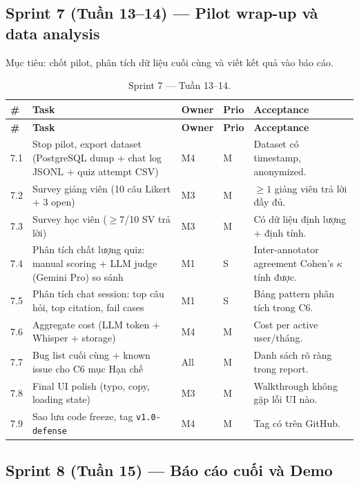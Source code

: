 \subsection{Sprint 7 (Tuần 13--14) --- Pilot wrap-up và data analysis}
\label{subsec:sprint7-gd2}

Mục tiêu: chốt pilot, phân tích dữ liệu cuối cùng và viết kết quả vào
báo cáo.

\begin{longtable}{|p{0.7cm}|p{6.3cm}|p{1.2cm}|p{1cm}|p{3cm}|}
    \caption{Sprint 7 --- Tuần 13--14.}
    \label{tab:sprint7-gd2} \\
    \hline
    \textbf{\#} & \textbf{Task} & \textbf{Owner} & \textbf{Prio} & \textbf{Acceptance} \\
    \hline
    \endfirsthead
    \hline
    \textbf{\#} & \textbf{Task} & \textbf{Owner} & \textbf{Prio} & \textbf{Acceptance} \\
    \hline
    \endhead

    7.1 & Stop pilot, export dataset (PostgreSQL dump + chat log JSONL + quiz attempt CSV) & M4 & M & Dataset có timestamp, anonymized. \\ \hline
    7.2 & Survey giảng viên (10 câu Likert + 3 open) & M3 & M & $\geq 1$ giảng viên trả lời đầy đủ. \\ \hline
    7.3 & Survey học viên ($\geq 7$/10 SV trả lời) & M3 & M & Có dữ liệu định lượng + định tính. \\ \hline
    7.4 & Phân tích chất lượng quiz: manual scoring + LLM judge (Gemini Pro) so sánh & M1 & S & Inter-annotator agreement Cohen's $\kappa$ tính được. \\ \hline
    7.5 & Phân tích chat session: top câu hỏi, top citation, fail cases & M1 & S & Bảng pattern phân tích trong C6. \\ \hline
    7.6 & Aggregate cost (LLM token + Whisper + storage) & M4 & M & Cost per active user/tháng. \\ \hline
    7.7 & Bug list cuối cùng + known issue cho C6 mục Hạn chế & All & M & Danh sách rõ ràng trong report. \\ \hline
    7.8 & Final UI polish (typo, copy, loading state) & M3 & M & Walkthrough không gặp lỗi UI nào. \\ \hline
    7.9 & Sao lưu code freeze, tag \texttt{v1.0-defense} & M4 & M & Tag có trên GitHub. \\ \hline
\end{longtable}

\subsection{Sprint 8 (Tuần 15) --- Báo cáo cuối và Demo}
\label{subsec:sprint8-gd2}

